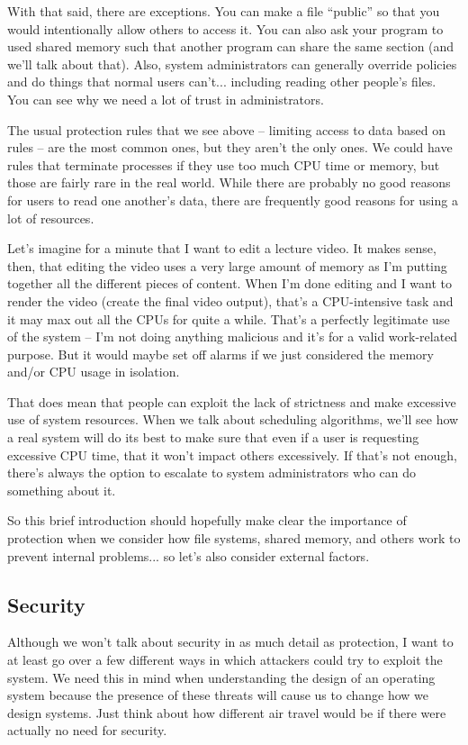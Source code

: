 With that said, there are exceptions. You can make a file ``public'' so that you would intentionally allow others to access it. You can also ask your program to used shared memory such that another program can share the same section (and we'll talk about that). Also, system administrators can generally override policies and do things that normal users can't... including reading other people's files. You can see why we need a lot of trust in administrators.

The usual protection rules that we see above -- limiting access to data based on rules -- are the most common ones, but they aren't the only ones. We could have rules that terminate processes if they use too much CPU time or memory, but those are fairly rare in the real world. While there are probably no good reasons for users to read one another's data, there are frequently good reasons for using a lot of resources. 

Let's imagine for a minute that I want to edit a lecture video. It makes sense, then, that editing the video uses a very large amount of memory as I'm putting together all the different pieces of content. When I'm done editing and I want to render the video (create the final video output), that's a CPU-intensive task and it may max out all the CPUs for quite a while. That's a perfectly legitimate use of the system -- I'm not doing anything malicious and it's for a valid work-related purpose. But it would maybe set off alarms if we just considered the memory and/or CPU usage in isolation.

That does mean that people can exploit the lack of strictness and make excessive use of system resources. When we talk about scheduling algorithms, we'll see how a real system will do its best to make sure that even if a user is requesting excessive CPU time, that it won't impact others excessively. If that's not enough, there's always the option to escalate to system administrators who can do something about it.

So this brief introduction should hopefully make clear the importance of protection when we consider how file systems, shared memory, and others work to prevent internal problems... so let's also consider external factors.

\subsection*{Security}
Although we won't talk about security in as much detail as protection, I want to at least go over a few different ways in which attackers could try to exploit the system. We need this in mind when understanding the design of an operating system because the presence of these threats will cause us to change how we design systems. Just think about how different air travel would be if there were actually no need for security. 

